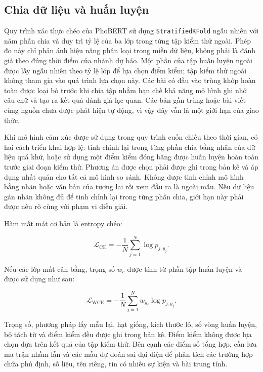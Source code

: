 \documentclass[12pt, a4paper, oneside]{report}
\begin{document}
\subsection{Chia dữ liệu và huấn luyện}

Quy trình xác thực chéo của PhoBERT sử dụng \texttt{StratifiedKFold} ngẫu nhiên với năm phần
chia và duy trì tỷ lệ của ba lớp trong từng tập kiểm thử ngoài. Phép đo này chỉ phản ánh hiệu
năng phân loại trong miền dữ liệu, không phải là đánh giá theo đúng thời điểm của nhánh dự
báo. Một phần của tập huấn luyện ngoài được lấy ngẫu nhiên theo tỷ lệ lớp để lựa chọn điểm
kiểm; tập kiểm thử ngoài không tham gia vào quá trình lựa chọn này. Các bài có đầu vào trùng
khớp hoàn toàn được loại bỏ trước khi chia tập nhằm hạn chế khả năng mô hình ghi nhớ câu chữ
và tạo ra kết quả đánh giá lạc quan. Các bản gần trùng hoặc bài viết cùng nguồn chưa được
phát hiện tự động, vì vậy đây vẫn là một giới hạn của giao thức.

Khi mô hình cảm xúc được sử dụng trong quy trình cuốn chiếu theo thời gian, có hai cách triển
khai hợp lệ: tinh chỉnh lại trong từng phần chia bằng nhãn của dữ liệu quá khứ, hoặc sử dụng
một điểm kiểm đóng băng được huấn luyện hoàn toàn trước giai đoạn kiểm thử. Phương án được
chọn phải được ghi trong bản kê và áp dụng nhất quán cho tất cả mô hình so sánh. Không được
tinh chỉnh mô hình bằng nhãn hoặc văn bản của tương lai rồi xem đầu ra là ngoài mẫu. Nếu dữ
liệu gán nhãn không đủ để tinh chỉnh lại trong từng phần chia, giới hạn này phải được nêu rõ
cùng với phạm vi diễn giải.

Hàm mất mát cơ bản là entropy chéo:

\begin{equation}
  \mathcal{L}_{\mathrm{CE}}=-\frac{1}{N}\sum_{j=1}^{N}
  \log p_{j,y_j}.
  \label{eq:sentiment-loss}
\end{equation}

Nếu các lớp mất cân bằng, trọng số $w_c$ được tính từ phần tập huấn luyện và được sử dụng
như sau:

\begin{equation}
  \mathcal{L}_{\mathrm{WCE}}=-\frac{1}{N}\sum_{j=1}^{N}
  w_{y_j}\log p_{j,y_j}.
  \label{eq:weighted-sentiment-loss}
\end{equation}

Trọng số, phương pháp lấy mẫu lại, hạt giống, kích thước lô, số vòng huấn luyện, bộ tách từ
và điểm kiểm đều được ghi trong bản kê. Điểm kiểm không được lựa chọn dựa trên kết quả của
tập kiểm thử. Bên cạnh các điểm số tổng hợp, cần lưu ma trận nhầm lẫn và các mẫu dự đoán sai
đại diện để phân tích các trường hợp chứa phủ định, số liệu, tên riêng, tin có nhiều sự kiện
và bài trung tính.
\end{document}
